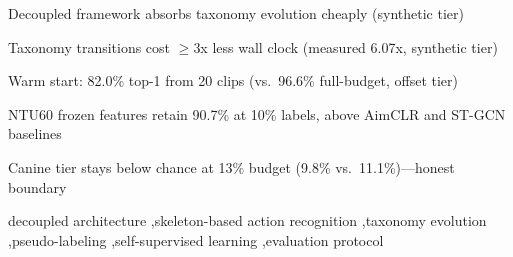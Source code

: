 \documentclass[a4paper,fleqn]{cas-sc}
\begin{document}

\begin{highlights}
\item Decoupled framework absorbs taxonomy evolution cheaply (synthetic tier)
\item Taxonomy transitions cost $\geq$3x less wall clock (measured 6.07x, synthetic tier)
\item Warm start: 82.0\% top-1 from 20 clips (vs.\ 96.6\% full-budget, offset tier)
\item NTU60 frozen features retain 90.7\% at 10\% labels, above AimCLR and ST-GCN baselines
\item Canine tier stays below chance at 13\% budget (9.8\% vs.\ 11.1\%)---honest boundary
\end{highlights}

\begin{keywords}
decoupled architecture \sep skeleton-based action recognition \sep taxonomy evolution \sep pseudo-labeling \sep self-supervised learning \sep evaluation protocol
\end{keywords}

\hfuzz=120pt
\maketitle
\hfuzz=0.1pt
\end{document}
